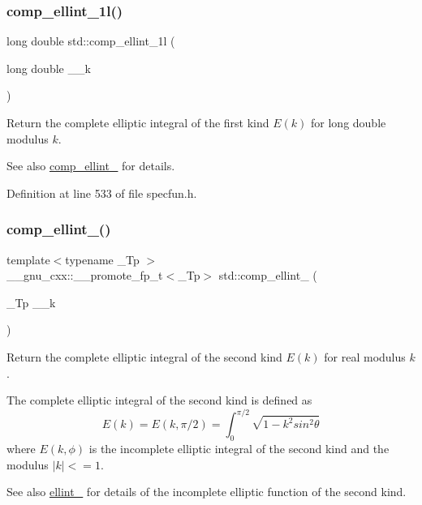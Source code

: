 \subsubsection{\texorpdfstring{comp\+\_\+ellint\+\_\+1l()}{comp\_ellint\_1l()}}
{\footnotesize\ttfamily long double std\+::comp\+\_\+ellint\+\_\+1l (\begin{DoxyParamCaption}\item[{long double}]{\+\_\+\+\_\+k }\end{DoxyParamCaption})\hspace{0.3cm}{\ttfamily [inline]}}

Return the complete elliptic integral of the first kind $ E(k) $ for {\ttfamily long double} modulus $ k $.

\begin{DoxySeeAlso}{See also}
\hyperlink{group__tr29124__math__spec__func_ga63f1e2ba4b94e170554d36882ee2be1d}{comp\+\_\+ellint\+\_} for details. 
\end{DoxySeeAlso}


Definition at line 533 of file specfun.\+h.

\mbox{\label{group__tr29124__math__spec__func_gacd0057c6937200dc296c98d7e53f5112}} 
\subsubsection{\texorpdfstring{comp\+\_\+ellint\+\_()}{comp\_ellint\_2()}}
{\footnotesize\ttfamily template$<$typename \+\_\+\+Tp $>$ \\
\+\_\+\+\_\+gnu\+\_\+cxx\+::\+\_\+\+\_\+promote\+\_\+fp\+\_\+t$<$\+\_\+\+Tp$>$ std\+::comp\+\_\+ellint\+\_ (\begin{DoxyParamCaption}\item[{\+\_\+\+Tp}]{\+\_\+\+\_\+k }\end{DoxyParamCaption})\hspace{0.3cm}{\ttfamily [inline]}}

Return the complete elliptic integral of the second kind $ E(k) $ for real modulus $ k $.

The complete elliptic integral of the second kind is defined as \[ E(k) = E(k,\pi/2) = \int_0^{\pi/2}\sqrt{1 - k^2 sin^2\theta} \] where $ E(k,\phi) $ is the incomplete elliptic integral of the second kind and the modulus $ |k| <= 1 $. \begin{DoxySeeAlso}{See also}
\hyperlink{group__tr29124__math__spec__func_ga6db0d1043cad03894edb7def7b70bc39}{ellint\+\_} for details of the incomplete elliptic function of the second kind.
\end{DoxySeeAlso}

